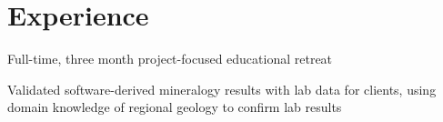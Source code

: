 \documentclass[letterpaper]{deedy-resume} %
\begin{document}
\hfill
%
%
\begin{minipage}[t]{0.66\textwidth} %


\section{Experience}


\vspace{\topsep} %
\begin{tightitemize}
\item Full-time, three month project-focused educational retreat  \\
\end{tightitemize}

\sectionspace %



\begin{tightitemize}
\item Validated software-derived mineralogy results with lab data for clients, using domain knowledge of regional geology to confirm lab results
\end{tightitemize}

\sectionspace %




\end{minipage}
\end{document}
